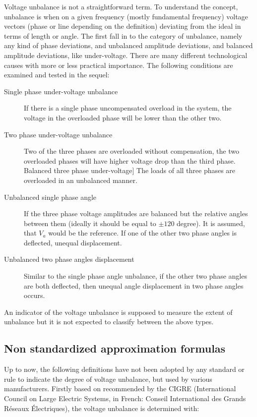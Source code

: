        Voltage unbalance is not a straightforward term. To understand the concept, unbalance is when on a given frequency (mostly fundamental frequency) voltage vectors (phase or line depending on the definition) deviating from the ideal in terms of length or angle. The first fall in to the category of unbalance, namely any kind of phase deviations, and unbalanced amplitude deviations, and balanced amplitude deviations, like under-voltage. There are many different technological causes with more or less practical importance. The following conditions are examined and tested in the sequel:
        \begin{description}
        \item[Single phase under-voltage unbalance]  If there is a single phase uncompensated overload in the system, the voltage in the overloaded phase will be lower than the other two.
        \item[Two phase under-voltage unbalance]  Two of the three phases are overloaded without compensation, the two overloaded phases will have higher voltage drop than the third phase.
        Balanced three phase under-voltage]  The loads of all three phases are overloaded in an unbalanced manner.
        \item[Unbalanced single phase angle]  If the three phase voltage amplitudes are balanced but the relative angles between them (ideally it should be equal to $\pm120$ degree). It is assumed, that $V_a$ would be the reference. If one of the other two phase angles is deflected, unequal displacement.
        \item[Unbalanced two phase angles displacement] Similar to the single phase angle unbalance, if the other two phase angles are both deflected, then unequal angle displacement in two phase angles occurs.
        \end{description}
        An indicator of the voltage unbalance is supposed to measure the extent of unbalance but it is not expected to classify between the above types.
	
	\subsection{Non standardized approximation formulas}\label{BASICUNB:sec:ApproxFormula}
	
	Up to now, the following definitions have not been adopted by any standard or rule to indicate the degree of voltage unbalance, but used by various manufacturers. Firstly based on \cite{eugene1986new} recommended by the CIGRE (International Council on Large Electric Systems, in French: Conseil International des Grands Réseaux Électriques), the voltage unbalance is determined with:
	
